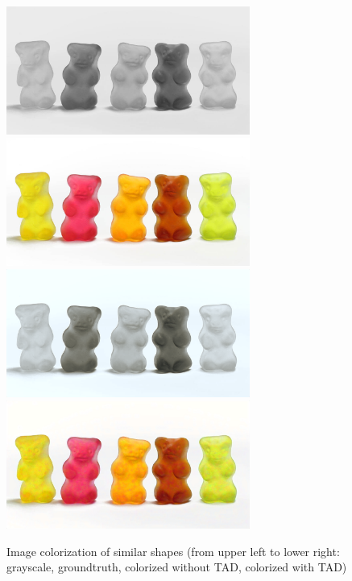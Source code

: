 \begin{figure}[!htbp]
	\centering
	\includegraphics[width=8cm]{figures/gummibears_GRY}
	\includegraphics[width=8cm]{figures/gummibears_COL}
	\includegraphics[width=8cm]{figures/gummibears_SCOLT_notad}
	\includegraphics[width=8cm]{figures/gummibears_SCOLT}
	\caption{Image colorization of similar shapes (from upper left to lower
	right: grayscale, groundtruth, colorized without \ac{TAD}, colorized with \ac{TAD})}
  \label{fig:gummibears}
\end{figure}

